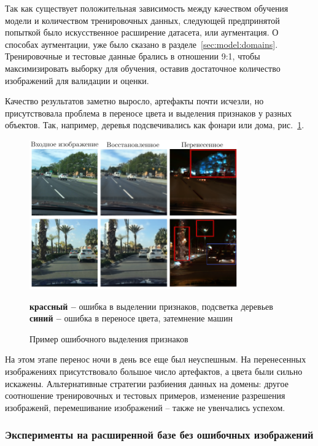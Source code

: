 \documentclass[11pt,a4paper]{extarticle}
\begin{document}
{			Так как существует положительная зависимость между качеством обучения модели и количеством тренировочных данных, следующей предпринятой попыткой было искусственное расширение датасета, или аугментация.
			О способах аугментации, уже было сказано в разделе~\ref{sec:model:domains}.
			Тренировочные и тестовые данные брались в отношении 9:1, чтобы максимизировать выборку для обучения, оставив достаточное количество изображений для валидации и оценки.
			
			Качество результатов заметно выросло, артефакты почти исчезли, но присутствовала проблема в переносе цвета и выделения признаков у разных объектов.
			Так, например, деревья подсвечивались как фонари или дома, рис.~\ref{pic:nexet_ext}.

			\begin{figure}[ht]
				\centering
				\includegraphics[width=0.8\textwidth]{img/nexet_ext}
				\caption{Пример ошибочного выделения признаков}{
					\small{
						{\color[HTML]{CB0000} \textbf{крассный --}} ошибка в выделении признаков, подсветка деревьев \\
						{\color[HTML]{3b4daf} \textbf{синий --}} ошибка в переносе цвета, затемнение машин
					}
				}
				\label{pic:nexet_ext}
			\end{figure}
			
			\noindent
			На этом этапе перенос ночи в день все еще был неуспешным. На перенесенных изображениях присутствовало большое число артефактов, а цвета были сильно искажены.
			Альтернативные стратегии разбиения данных на домены: другое соотношение тренировочных и тестовых примеров, изменение разрешения изображенй, перемешивание изображений -- также не увенчались успехом.
			
		\subsubsection{Эксперименты на расширенной базе без ошибочных изображений}\label{sec:tests:nexet_no_err}
			
}
\end{document}
